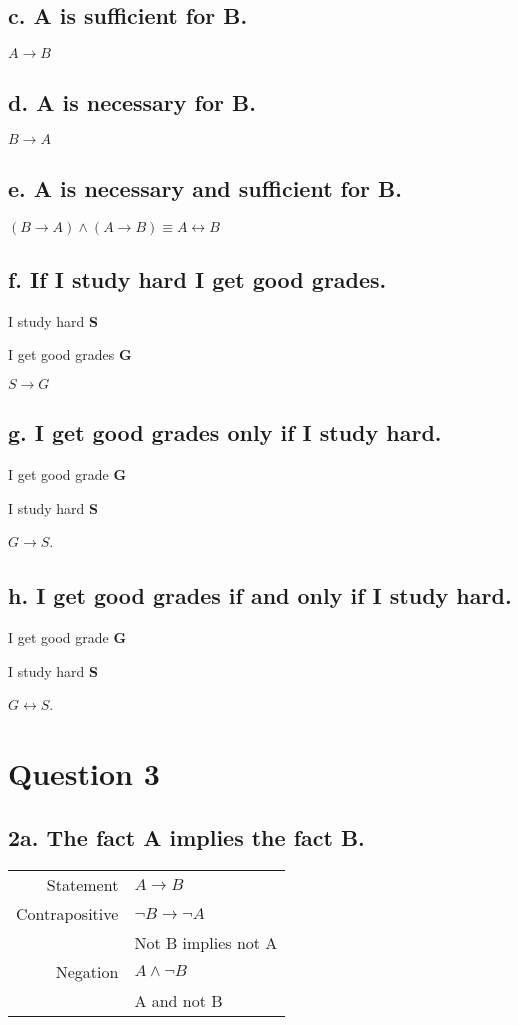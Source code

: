 \documentclass{article}
\begin{document}
\subsection*{c. A is sufficient for B.}
$A \rightarrow B$
\subsection*{d. A is necessary for B.}
$B \rightarrow A$
\subsection*{e. A is necessary and sufficient for B.}
$(B \rightarrow A) \land (A \rightarrow B) \equiv A \leftrightarrow B$
\subsection*{f. If I study hard I get good grades.}
I study hard \textbf{S}

I get good grades \textbf{G}

$S \rightarrow G$

\subsection*{g. I get good grades only if I study hard.}
I get good grade \textbf{G}

I study hard \textbf{S}

$G \rightarrow S$.

\subsection*{h. I get good grades if and only if I study hard.}
I get good grade \textbf{G}

I study hard \textbf{S}

$G \leftrightarrow S$.

\section*{Question 3}
\subsection*{2a. The fact A implies the fact B.}
\begin{tabular}{r|l}
    Statement & $A \rightarrow B$ \\
    Contrapositive & $\neg B \rightarrow \neg A$ \\
    & Not B implies not A \\
    Negation & $A \land \neg B$ \\
    & A and not B
\end{tabular}
\end{document}
